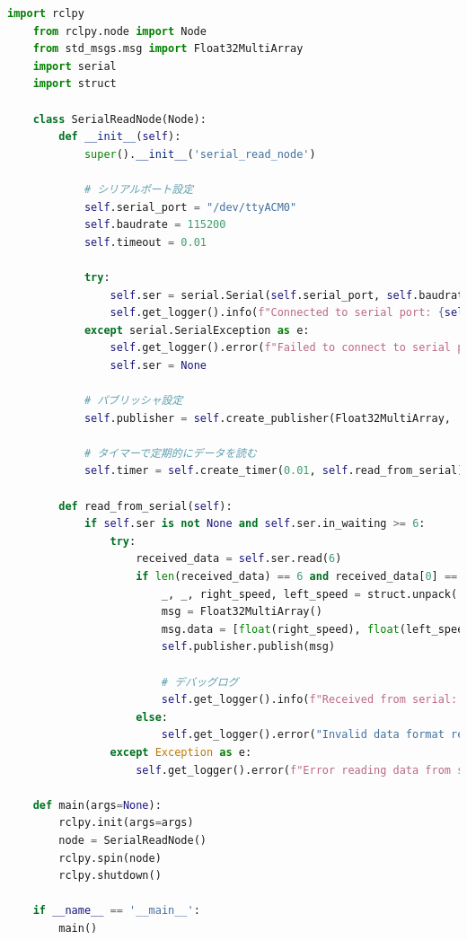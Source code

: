 \begin{lstlisting}[language=Python, caption=serial\_read\_node.py]
    import rclpy
    from rclpy.node import Node
    from std_msgs.msg import Float32MultiArray
    import serial
    import struct
    
    class SerialReadNode(Node):
        def __init__(self):
            super().__init__('serial_read_node')
    
            # シリアルポート設定
            self.serial_port = "/dev/ttyACM0"
            self.baudrate = 115200
            self.timeout = 0.01
    
            try:
                self.ser = serial.Serial(self.serial_port, self.baudrate, timeout=self.timeout)
                self.get_logger().info(f"Connected to serial port: {self.serial_port}")
            except serial.SerialException as e:
                self.get_logger().error(f"Failed to connect to serial port: {e}")
                self.ser = None
    
            # パブリッシャ設定
            self.publisher = self.create_publisher(Float32MultiArray, 'wheel_feedback', 10)
    
            # タイマーで定期的にデータを読む
            self.timer = self.create_timer(0.01, self.read_from_serial)
    
        def read_from_serial(self):
            if self.ser is not None and self.ser.in_waiting >= 6:
                try:
                    received_data = self.ser.read(6)
                    if len(received_data) == 6 and received_data[0] == 0xA5 and received_data[1] == 0xA5:
                        _, _, right_speed, left_speed = struct.unpack('>BBhh', received_data)
                        msg = Float32MultiArray()
                        msg.data = [float(right_speed), float(left_speed)]
                        self.publisher.publish(msg)
    
                        # デバッグログ
                        self.get_logger().info(f"Received from serial: Right={right_speed}, Left={left_speed}")
                    else:
                        self.get_logger().error("Invalid data format received from serial.")
                except Exception as e:
                    self.get_logger().error(f"Error reading data from serial: {e}")
    
    def main(args=None):
        rclpy.init(args=args)
        node = SerialReadNode()
        rclpy.spin(node)
        rclpy.shutdown()
    
    if __name__ == '__main__':
        main()
\end{lstlisting}

